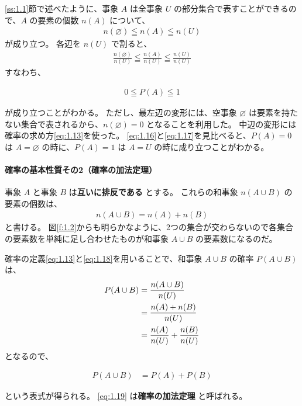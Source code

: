 \documentclass[12pt]{ltjsarticle}\usepackage{ifthen}\newcounter{enlarge}\setcounter{enlarge}{1}
\begin{document}
\ref{ss:1.1}節で述べたように、事象 $A$ は全事象 $U$ の部分集合で表すことができるので、$A$ の要素の個数 $n(A)$ について、
\begin{align}
  n(\varnothing) \leqq n(A) \leqq n(U) \label{eq:1.14}
\end{align}
が成り立つ。
各辺を $n(U)$ で割ると、
\begin{align}
  \frac{n(\varnothing)}{n(U)} \leqq \frac{n(A)}{n(U)} \leqq \frac{n(U)}{n(U)} \label{eq:1.16}
\end{align}
すなわち、
\begin{oframed}
\begin{align}
  0 \leqq P(A) \leqq 1 \label{eq:1.17}
\end{align}
\end{oframed}
\noindent
が成り立つことがわかる。
ただし、最左辺の変形には、空事象 $\varnothing$ は要素を持たない集合で表されるから、$n(\varnothing) = 0$ となることを利用した。
中辺の変形には確率の求め方\eqref{eq:1.13}を使った。
\eqref{eq:1.16}と\eqref{eq:1.17}を見比べると、$P(A) = 0$ は $A = \varnothing$ の時に、$P(A) = 1$ は $A = U$ の時に成り立つことがわかる。

\paragraph{確率の基本性質その2（確率の加法定理）}

事象 $A$ と事象 $B$ は\textbf{互いに排反である} とする。
これらの和事象 $n(A \cup B)$ の要素の個数は、
\begin{align}
  n(A \cup B) = n(A) + n(B) \label{eq:1.18}
\end{align}
と書ける。
図\ref{f:1.2}からも明らかなように、2つの集合が交わらないので各集合の要素数を単純に足し合わせたものが和事象 $A \cup B$ の要素数になるのだ。

確率の定義\eqref{eq:1.13}と\eqref{eq:1.18}を用いることで、和事象 $A \cup B$ の確率 $P(A \cup B)$ は、
\begin{align}
  P(A \cup B) &= \frac{n(A \cup B)}{n(U)} \notag \\
              &= \frac{n(A) + n(B)}{n(U)} \notag \\
              &= \frac{n(A)}{n(U)} + \frac{n(B)}{n(U)} 
\end{align}
となるので、
\begin{oframed}
  \begin{align}
    P(A \cup B) &= P(A) + P(B) \label{eq:1.19}
  \end{align}
\end{oframed}
\noindent
という表式が得られる。
\eqref{eq:1.19} は\textbf{確率の加法定理} と呼ばれる。
\end{document}
